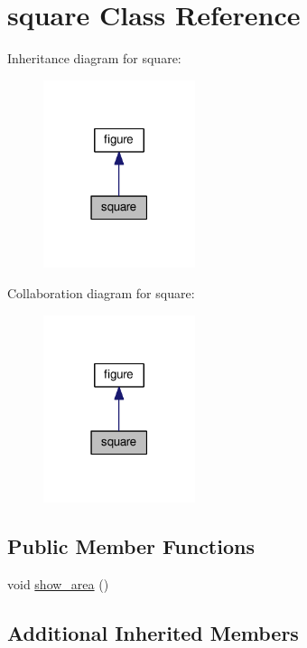 \hypertarget{classsquare}{}\section{square Class Reference}
\label{classsquare}


Inheritance diagram for square\+:
\nopagebreak
\begin{figure}[H]
\begin{center}
\leavevmode
\includegraphics[width=126pt]{classsquare__inherit__graph}
\end{center}
\end{figure}


Collaboration diagram for square\+:
\nopagebreak
\begin{figure}[H]
\begin{center}
\leavevmode
\includegraphics[width=126pt]{classsquare__coll__graph}
\end{center}
\end{figure}
\subsection*{Public Member Functions}
\begin{DoxyCompactItemize}
\item 
void \hyperlink{classsquare_a11ed588dc4a0d7e47f11f077f57d1a16}{show\+\_\+area} ()
\end{DoxyCompactItemize}
\subsection*{Additional Inherited Members}


